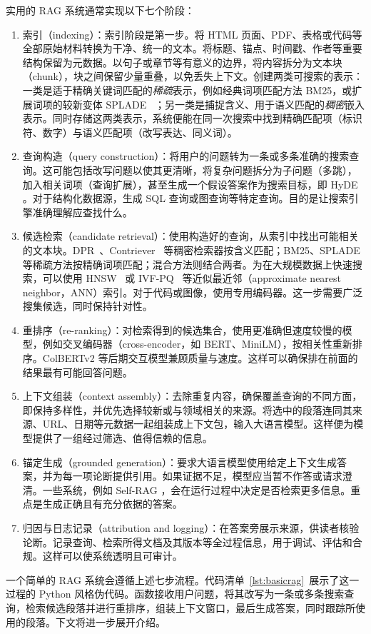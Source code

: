 实用的 RAG 系统通常实现以下七个阶段：
\begin{enumerate}
\item 索引（indexing）：索引阶段是第一步。将 HTML 页面、PDF、表格或代码等全部原始材料转换为干净、统一的文本。将标题、锚点、时间戳、作者等重要结构保留为元数据。以句子或章节等有意义的边界，将内容拆分为文本块（chunk），块之间保留少量重叠，以免丢失上下文。创建两类可搜索的表示：一类是适于精确关键词匹配的\emph{稀疏}表示，例如经典词项匹配方法 BM25，或扩展词项的较新变体 SPLADE ~\citep{formal2021splade}；另一类是捕捉含义、用于语义匹配的\emph{稠密}嵌入表示。同时存储这两类表示，系统便能在同一次搜索中找到精确匹配项（标识符、数字）与语义匹配项（改写表达、同义词）。

\item 查询构造（query construction）：将用户的问题转为一条或多条准确的搜索查询。这可能包括改写问题以使其更清晰，将复杂问题拆分为子问题（多跳），加入相关词项（查询扩展），甚至生成一个假设答案作为搜索目标，即 HyDE \citep{gao2023hyde}。对于结构化数据源，生成 SQL 查询或图查询等特定查询。目的是让搜索引擎准确理解应查找什么。

\item 候选检索（candidate retrieval）：使用构造好的查询，从索引中找出可能相关的文本块。DPR~\citep{karpukhin2020dense}、Contriever~\citep{izacard2022contriever} 等稠密检索器按含义匹配；BM25、SPLADE 等稀疏方法按精确词项匹配；混合方法则结合两者。为在大规模数据上快速搜索，可以使用 HNSW~\citep{malkov2018HNSWG} 或 IVF-PQ~\citep{herve2011PQNNS} 等近似最近邻（approximate nearest neighbor，ANN）索引。对于代码或图像，使用专用编码器。这一步需要广泛搜集候选，同时保持针对性。

\item 重排序（re-ranking）：对检索得到的候选集合，使用更准确但速度较慢的模型，例如交叉编码器（cross-encoder，如 BERT、MiniLM），按相关性重新排序。ColBERTv2 \citep{santhanam2022colbertv2} 等后期交互模型兼顾质量与速度。这样可以确保排在前面的结果最有可能回答问题。

\item 上下文组装（context assembly）：去除重复内容，确保覆盖查询的不同方面，即保持多样性，并优先选择较新或与领域相关的来源。将选中的段落连同其来源、URL、日期等元数据一起组装成上下文包，输入大语言模型。这样便为模型提供了一组经过筛选、值得信赖的信息。

\item 锚定生成（grounded generation）：要求大语言模型使用给定上下文生成答案，并为每一项论断提供引用。如果证据不足，模型应当暂不作答或请求澄清。一些系统，例如 Self-RAG \citep{asai2023selfrag}，会在运行过程中决定是否检索更多信息。重点是生成正确且有充分依据的答案。

\item 归因与日志记录（attribution and logging）：在答案旁展示来源，供读者核验论断。记录查询、检索所得文档及其版本等全过程信息，用于调试、评估和合规。这样可以使系统透明且可审计。
\end{enumerate}
一个简单的 RAG 系统会遵循上述七步流程。代码清单~\ref{lst:basicrag}~展示了这一过程的 Python 风格伪代码。函数接收用户问题，将其改写为一条或多条搜索查询，检索候选段落并进行重排序，组装上下文窗口，最后生成答案，同时跟踪所使用的段落。下文将进一步展开介绍。

